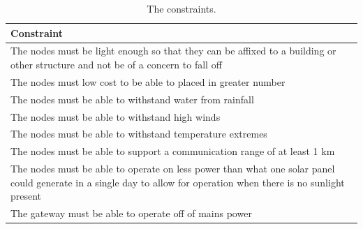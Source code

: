 
\begin{table}[H]
\centering
\caption{The constraints.}
\begin{tabularx}{\linewidth}{|X|}

\hline
Constraint \\
\hline\hline
The nodes must be light enough so that they can be affixed to a building or other structure and not be of a concern to fall off \\\hline
The nodes must low cost to be able to placed in greater number \\\hline
The nodes must be able to withstand water from rainfall \\\hline
The nodes must be able to withstand high winds \\\hline
The nodes must be able to withstand temperature extremes \\\hline
The nodes must be able to support a communication range of at least 1 km\\\hline
The nodes must be able to operate on less power than what one solar panel could generate in a single day to allow for operation when there is no sunlight present \\\hline
The gateway must be able to operate off of mains power \\\hline
\end{tabularx}
\label{tab:constraints}
\end{table}

